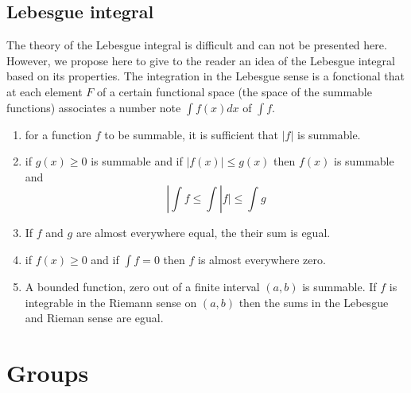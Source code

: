 \documentclass[12pt]{book}
\begin{document}
\section{Lebesgue integral}
The theory of the Lebesgue integral is difficult and can not be
presented here. However, we propose here to give to the reader an idea of the
Lebesgue integral based on its properties. 
The integration in the Lebesgue sense is a fonctional that at each
element $F$ of a certain functional space (the space of the summable
functions) associates a number note $\int f(x) dx$ of $\int f$.
\begin{enumerate}
\item for a function $f$ to be summable, it is sufficient that $|f|$
is summable.
\item if $g(x)\geq 0$ is summable  and if $|f(x)|\leq g(x)$ then
$f(x)$ is summable and
\begin{equation}
|\int f\leq\int|f|\leq\int g
\end{equation}
\item If $f$ and $g$ are almost everywhere equal, the their sum is
egual.
\item if $f(x)\geq 0$ and if $\int f=0$ then $f$ is almost everywhere
zero.
\item A bounded function, zero out of a finite interval $(a,b)$ is
summable. If $f$ is integrable in the Riemann sense on $(a,b)$ then
the sums in the Lebesgue and Rieman sense are egual.
\end{enumerate}



\chapter{Groups}\label{chapgroupes}
\end{document}
